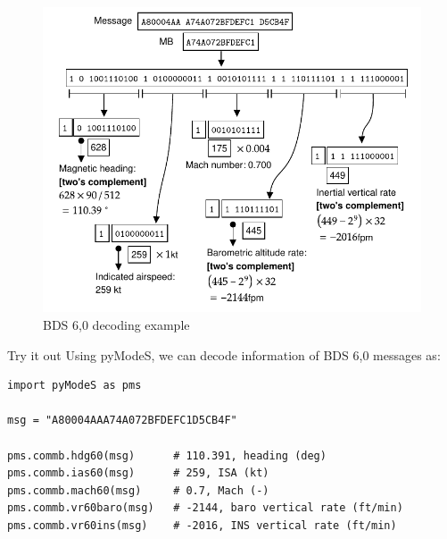 \begin{figure}[ht]
  \centering
  \includegraphics[scale=0.9]{figures/mode_s/bds60_example.pdf}
  \caption{BDS 6,0 decoding example}
  \label{fig:bds60_example}
\end{figure}

\begin{notebox}{Try it out}
Using pyModeS, we can decode information of BDS 6,0 messages as: 

\begin{verbatim}
import pyModeS as pms

msg = "A80004AAA74A072BFDEFC1D5CB4F"

pms.commb.hdg60(msg)      # 110.391, heading (deg)
pms.commb.ias60(msg)      # 259, ISA (kt)
pms.commb.mach60(msg)     # 0.7, Mach (-)
pms.commb.vr60baro(msg)   # -2144, baro vertical rate (ft/min)
pms.commb.vr60ins(msg)    # -2016, INS vertical rate (ft/min)
\end{verbatim}

\end{notebox}

